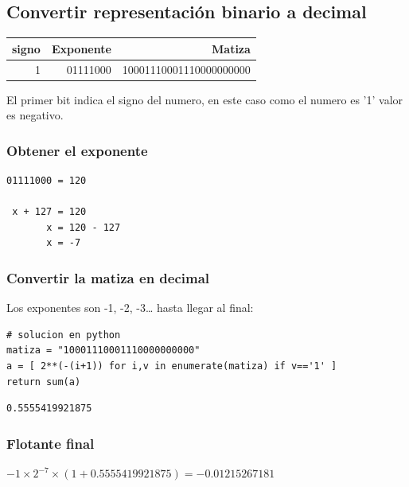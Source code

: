 \documentclass[11pt]{article}
\begin{document}
\subsection{Convertir representación binario a decimal}
\label{sec:org2ab60e6}

\begin{center}
\begin{tabular}{|r|r|r|}
\hline
signo & Exponente & Matiza\\
\hline
1 & 01111000 & 10001110001110000000000\\
\hline
\end{tabular}
\end{center}

El primer bit indica el signo del numero, en este caso como el numero es '1' valor es negativo.

\subsubsection*{Obtener el exponente}
\label{sec:org09e8b55}
\begin{verbatim}
01111000 = 120

 x + 127 = 120 
       x = 120 - 127
       x = -7
\end{verbatim}

\subsubsection*{Convertir la matiza en decimal}
\label{sec:org55854c8}
Los exponentes son -1, -2, -3\ldots{} hasta llegar al final:

\begin{verbatim}
# solucion en python
matiza = "10001110001110000000000"
a = [ 2**(-(i+1)) for i,v in enumerate(matiza) if v=='1' ]
return sum(a)
\end{verbatim}

\begin{verbatim}
0.5555419921875
\end{verbatim}

\subsubsection*{Flotante final}
\label{sec:org7af99b8}
\(-1 \times 2^{-7} \times (1+0.5555419921875) = -0.01215267181\)
\end{document}
